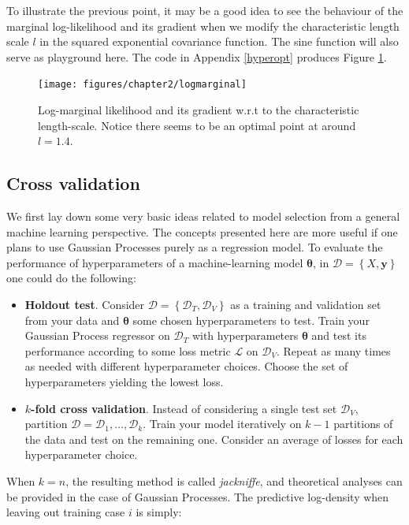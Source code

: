 \documentclass[10pt,a4paper,twoside]{book}
\begin{document}
To illustrate the previous point, it may be a good idea to see the behaviour of the marginal log-likelihood and its gradient when we modify the characteristic length scale $l$ in the squared exponential covariance function. The sine function will also serve as playground here. The code in Appendix \ref{hyperopt} produces Figure \ref{fig:logmarginal}.


\begin{figure}
\caption{Log-marginal likelihood and its gradient w.r.t to the characteristic length-scale. Notice there seems to be an optimal point at around $l = 1.4$.}
\label{fig:logmarginal}
\texttt{[image: figures/chapter2/logmarginal]}
\end{figure}


\subsection{Cross validation}

We first lay down some very basic ideas related to model selection from a general machine learning perspective. The concepts presented here are more useful if one plans to use Gaussian Processes purely as a regression model. To evaluate the performance of hyperparameters of a machine-learning model $\boldsymbol{\theta}$, in $\mathcal{D}=\left\lbrace X, \boldsymbol{y}\right\rbrace$ one could do the following:

\begin{itemize}
\item \textbf{Holdout test}. Consider $\mathcal{D} = \left\lbrace \mathcal{D}_T, \mathcal{D}_V \right\rbrace$ as a training and validation set from your data and $\boldsymbol{\theta}$ some chosen hyperparameters to test. Train your Gaussian Process regressor on $\mathcal{D}_T$ with hyperparameters $\boldsymbol{\theta}$ and test its performance according to some loss metric $\mathcal{L}$ on $\mathcal{D}_V$. Repeat as many times as needed with different hyperparameter choices. Choose the set of hyperparameters yielding the lowest loss.
\item \textbf{$k$-fold cross validation}. Instead of considering a single test set $\mathcal{D}_V$, partition $\mathcal{D}={\mathcal{D}_1,\dots, \mathcal{D}_k}$. Train your model iteratively on $k-1$ partitions of the data and test on the remaining one. Consider an average of losses for each hyperparameter choice.  
\end{itemize}

When $k=n$, the resulting method is called \textit{jackniffe}, and theoretical analyses can be provided in the case of Gaussian Processes. The predictive log-density when leaving out training case $i$ is simply:
\end{document}
